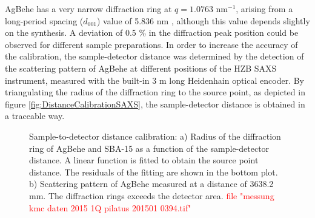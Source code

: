 AgBehe has a very narrow diffraction ring at $q=1.0763$ nm$^{-1}$, arising from a long-period spacing ($d_{001}$) value of 5.836 nm \citep{blanton_jcpdsinternational_1995}, although this value depends slightly on the synthesis. A deviation of 0.5 $\%$ in the diffraction peak position could be observed for different sample preparations. In order to increase the accuracy of the calibration, the sample-detector distance was determined by the detection of the scattering pattern of AgBehe at different positions of the HZB SAXS instrument, measured with the built-in 3 m long Heidenhain optical encoder. By triangulating the radius of the diffraction ring to the source point, as depicted in figure \ref{fig:DistanceCalibrationSAXS}, the sample-detector distance is obtained in a traceable way.

\begin{figure}
	\centering
		\caption{Sample-to-detector distance calibration: a) Radius of the diffraction ring of AgBehe and SBA-15 as a function of the sample-detector distance. A linear function is fitted to obtain the source point distance. The residuals of the fitting are shown in the bottom plot. b) Scattering pattern of AgBehe measured at a distance of 3638.2 mm. The diffraction rings exceeds the detector area. \textcolor{red}{file "messung kmc daten 2015 1Q pilatus 201501 0394.tif"}}
\end{figure}

